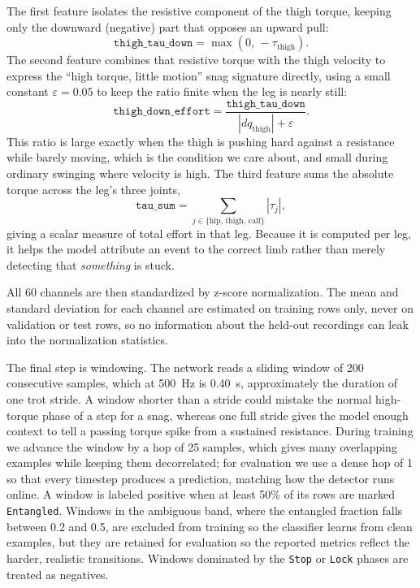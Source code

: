 The first feature isolates the resistive component of the thigh torque, keeping only the downward (negative) part that opposes an upward pull:
\begin{equation}
\texttt{thigh\_tau\_down} = \max(0,\, -\tau_{\text{thigh}}).
\end{equation}
The second feature combines that resistive torque with the thigh velocity to express the ``high torque, little motion'' snag signature directly, using a small constant $\varepsilon = 0.05$ to keep the ratio finite when the leg is nearly still:
\begin{equation}
\texttt{thigh\_down\_effort} = \frac{\texttt{thigh\_tau\_down}}{|dq_{\text{thigh}}| + \varepsilon}.
\end{equation}
This ratio is large exactly when the thigh is pushing hard against a resistance while barely moving, which is the condition we care about, and small during ordinary swinging where velocity is high. The third feature sums the absolute torque across the leg's three joints,
\begin{equation}
\texttt{tau\_sum} = \sum_{j \in \{\text{hip},\,\text{thigh},\,\text{calf}\}} |\tau_j|,
\end{equation}
giving a scalar measure of total effort in that leg. Because it is computed per leg, it helps the model attribute an event to the correct limb rather than merely detecting that \emph{something} is stuck.

All 60 channels are then standardized by z-score normalization. The mean and standard deviation for each channel are estimated on training rows only, never on validation or test rows, so no information about the held-out recordings can leak into the normalization statistics.

The final step is windowing. The network reads a sliding window of 200 consecutive samples, which at 500~Hz is 0.40~s, approximately the duration of one trot stride. A window shorter than a stride could mistake the normal high-torque phase of a step for a snag, whereas one full stride gives the model enough context to tell a passing torque spike from a sustained resistance. During training we advance the window by a hop of 25 samples, which gives many overlapping examples while keeping them decorrelated; for evaluation we use a dense hop of 1 so that every timestep produces a prediction, matching how the detector runs online. A window is labeled positive when at least 50\% of its rows are marked \texttt{Entangled}. Windows in the ambiguous band, where the entangled fraction falls between 0.2 and 0.5, are excluded from training so the classifier learns from clean examples, but they are retained for evaluation so the reported metrics reflect the harder, realistic transitions. Windows dominated by the \texttt{Stop} or \texttt{Lock} phases are treated as negatives.